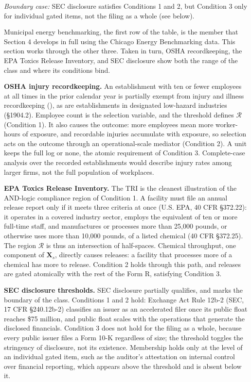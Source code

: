 \textit{Boundary case:} SEC disclosure satisfies Conditions 1 and 2, but Condition 3 only for individual gated items, not the filing as a whole (see below).

Municipal energy benchmarking, the first row of the table, is the member that Section 4 develops in full using the Chicago Energy Benchmarking data. This section works through the other three. Taken in turn, OSHA recordkeeping, the EPA Toxics Release Inventory, and SEC disclosure show both the range of the class and where its conditions bind.

\textbf{OSHA injury recordkeeping.} An establishment with ten or fewer employees at all times in the prior calendar year is partially exempt from injury and illness recordkeeping (), as are establishments in designated low-hazard industries (§1904.2). Employee count is the selection variable, and the threshold defines $\mathcal{R}$ (Condition 1). It also causes the outcome: more employees mean more worker-hours of exposure, and recordable injuries accumulate with exposure, so selection acts on the outcome through an operational-scale mediator (Condition 2). A unit keeps the full log or none, the atomic requirement of Condition 3. Complete-case analysis over the recorded establishments would describe injury rates among larger firms, not the full population of workplaces.

\textbf{EPA Toxics Release Inventory.} The TRI is the cleanest illustration of the AND-logic compliance region of Condition 1. A facility must file an annual release report only if it meets three criteria at once (U.S. EPA, 40 CFR §372.22): it operates in a covered industry sector, employs the equivalent of ten or more full-time staff, and manufactures or processes more than 25,000 pounds, or otherwise uses more than 10,000 pounds, of a listed chemical (40 CFR §372.25). The region $\mathcal{R}$ is thus an intersection of half-spaces. Chemical throughput, one component of $\mathbf{X}_s$, directly causes releases: a facility that processes more of a chemical has more to release. Condition 2 holds through this path, and releases are gated atomically with the rest of the Form R, satisfying Condition 3.

\textbf{SEC disclosure thresholds.} SEC disclosure partially qualifies, and marks the boundary of the class. Conditions 1 and 2 hold: Exchange Act Rule 12b-2 (SEC, 17 CFR §240.12b-2) classifies an issuer as an accelerated filer once its public float reaches \$75 million, and public float scales with the operations that generate the disclosed financials. Condition 3 does not hold for the filing as a whole, because every public issuer files a Form 10-K regardless of size; the threshold toggles the stringency of disclosure, not its existence. Membership holds only at the level of an individual gated item, such as the auditor's attestation on internal control over financial reporting, which appears above the threshold and is absent below it.

